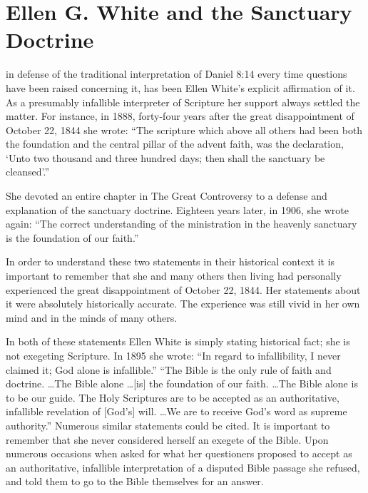 \chapter{Ellen G. White and the Sanctuary Doctrine}
\label{ch:egw}

 in defense of the traditional interpretation of Daniel
8:14 every time questions have been raised concerning it, has been Ellen
White's explicit affirmation of it. As a presumably infallible interpreter
of Scripture her support always settled the matter. For instance, in 1888,
forty-four years after the great disappointment of October 22, 1844 she
wrote: ``The scripture which above all others had been both the foundation
and the central pillar of the advent faith, was the declaration, `Unto two
thousand and three hundred days; then shall the sanctuary be 
cleansed'.''

She devoted an entire chapter in The Great Controversy to a defense and
explanation of the sanctuary doctrine.
 Eighteen years later, in 1906, she
 wrote again: ``The correct understanding of the ministration in the heavenly
 sanctuary is the foundation of our faith.''

In order to understand these two statements in their historical context it
is important to remember that she and many others then living had personally
experienced the great disappointment of October 22, 1844. Her statements
about it were absolutely historically accurate. The experience was still
vivid in her own mind and in the minds of many others. 

\newpage
In both of these statements Ellen White is simply stating historical fact;
she is not exegeting Scripture. In 1895 she wrote: ``In regard to
infallibility, I never claimed it; God alone is infallible.''\cite{11} ``The Bible is
the only rule of faith and doctrine. \ldots The Bible alone \ldots [is] the
foundation of our faith. \ldots The Bible alone is to be our guide. The Holy
Scriptures are to be accepted as an authoritative, infallible revelation of
[God's] will. \ldots We are to receive God's word as supreme authority.''
Numerous similar statements could be cited. It is important to remember
that she never considered herself an exegete of the Bible. Upon numerous
occasions when asked for what her questioners proposed to accept as an
authoritative, infallible interpretation of a disputed Bible passage she
refused, and told them to go to the Bible themselves for an answer. 

